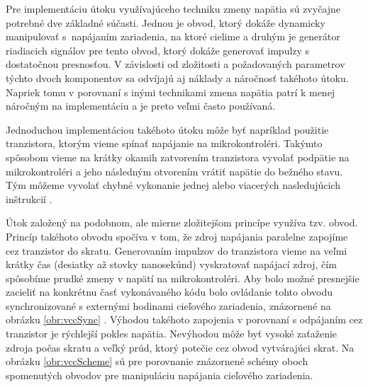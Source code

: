 Pre implementáciu útoku využívajúceho techniku zmeny napätia sú zvyčajne potrebné dve základné súčasti. Jednou je obvod, ktorý dokáže dynamicky manipulovať s~napájaním zariadenia, na ktoré cielime a druhým je generátor riadiacich signálov pre tento obvod, ktorý dokáže generovať impulzy s dostatočnou presnosťou. V závislosti od zložitosti a požadovaných parametrov týchto dvoch komponentov sa odvíjajú aj náklady a náročnosť takéhoto útoku. Napriek tomu v porovnaní s inými technikami zmena napätia patrí k menej náročným na implementáciu a je preto veľmi často používaná. 

Jednoduchou implementáciou takéhoto útoku môže byť napríklad použitie tranzistora, ktorým vieme spínať napájanie na mikrokontroléri. Takýmto spôsobom vieme na krátky okamih zatvorením tranzistora vyvolať podpätie na mikrokontroléri a jeho následným otvorením vrátiť napätie do bežného stavu. Tým môžeme vyvolať chybné vykonanie jednej alebo viacerých nasledujúcich inštrukcií \cite{vccOnTheCheap}.

Útok založený na podobnom, ale mierne zložitejšom princípe využíva tzv.  obvod. Princíp takéhoto obvodu spočíva v tom, že zdroj napájania paralelne zapojíme cez tranzistor do skratu. Generovaním impulzov do tranzistora vieme na veľmi krátky čas (desiatky až stovky nanosekúnd) vyskratovať napájací zdroj, čím spôsobíme prudké zmeny v napätí na mikrokontroléri. Aby bolo možné presnejšie zacieliť na konkrétnu časť vykonávaného kódu bolo ovládanie tohto obvodu synchronizované s externými hodinami cieľového zariadenia, znázornené na obrázku \ref{obr:vccSync} \cite{crowbars}. Výhodou takéhoto zapojenia v porovnaní s odpájaním cez tranzistor je rýchlejší pokles napätia. Nevýhodou môže byť vysoké zaťaženie zdroja počas skratu a veľký prúd, ktorý potečie cez obvod vytvárajúci skrat. Na obrázku \ref{obr:vccScheme} sú pre porovnanie znázornené schémy oboch spomenutých obvodov pre manipuláciu napájania cieľového zariadenia.

